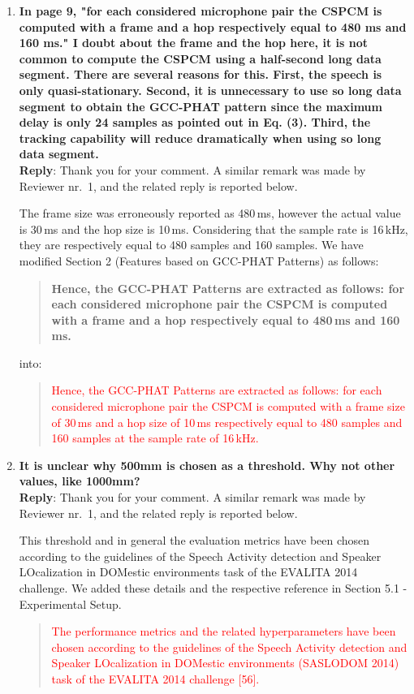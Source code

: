 \documentclass[11pt, technote, letterpaper, oneside, onecolumn]{IEEEtran}
\begin{document}
\begin{enumerate}
\item  \textbf{In page 9, "for each considered microphone pair the CSPCM is computed with a frame and a hop respectively equal to 480 ms and 160 ms." I doubt about the frame and the hop here, it is not common to compute the CSPCM using a half-second long data segment. There are several reasons for this. First, the speech is only quasi-stationary. Second, it is unnecessary to use so long data segment to obtain the GCC-PHAT pattern since the maximum delay is only 24 samples as pointed out in Eq. (3). Third, the tracking capability will reduce dramatically when using so long data segment.\\}
\textbf{Reply}: Thank you for your comment. A similar remark was made by Reviewer nr.\ 1, and the related reply is reported below.

The frame size was erroneously reported as 480\,ms, however the actual value is 30\,ms and the hop size is 10\,ms. Considering that the sample rate is 16\,kHz, they are respectively equal to 480 samples and 160 samples. We have modified Section 2 (Features based on GCC-PHAT Patterns) as follows:

\begin{quote}
	\textbf{Hence, the GCC-PHAT Patterns are extracted as follows: for each considered microphone pair the CSPCM is computed with a frame and a hop respectively equal to 480\,ms and 160\,ms.}
\end{quote}
into:
\begin{quote}
	\textcolor{red}{Hence, the GCC-PHAT Patterns are extracted as follows: for each considered microphone pair the CSPCM is computed with a frame size of 30\,ms and a hop size of 10\,ms respectively equal to 480 samples and 160 samples at the sample rate of 16\,kHz.}
\end{quote}


\item  \textbf{It is unclear why 500mm is chosen as a threshold. Why not other values, like 1000mm?\\}
\textbf{Reply}: Thank you for your comment.  A similar remark was made by Reviewer nr.\ 1, and the related reply is reported below.

This threshold and in general the evaluation metrics have been chosen according to the guidelines of the Speech Activity detection and Speaker LOcalization in DOMestic environments task of the EVALITA 2014 challenge. We added these details and the respective reference in Section 5.1 - Experimental Setup.
\begin{quote}
	\textcolor{red}{The performance metrics and the related hyperparameters have been chosen according to the guidelines of the Speech Activity detection and Speaker LOcalization in DOMestic environments (SASLODOM 2014) task of the EVALITA 2014 challenge [56].}
\end{quote}


\end{enumerate}
\end{document}

